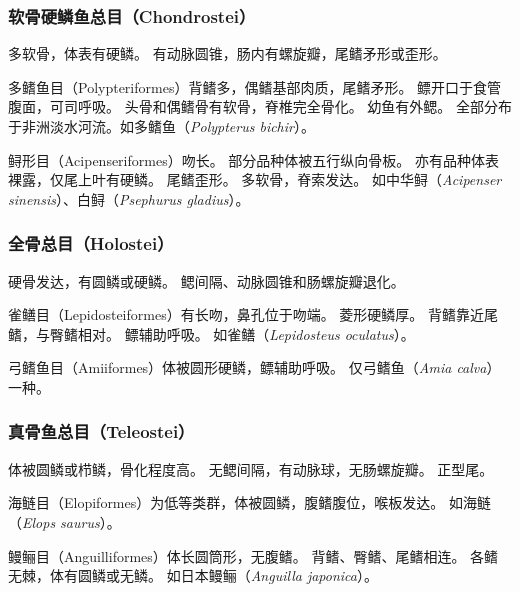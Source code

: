\documentclass[11pt]{article}
\begin{document}
\subsubsection{软骨硬鳞鱼总目（Chondrostei）}
多软骨，体表有硬鳞。
有动脉圆锥，肠内有螺旋瓣，尾鳍矛形或歪形。

\newline

多鳍鱼目（Polypteriformes）背鳍多，偶鳍基部肉质，尾鳍矛形。
鳔开口于食管腹面，可司呼吸。
头骨和偶鳍骨有软骨，脊椎完全骨化。
幼鱼有外鳃。
全部分布于非洲淡水河流。如多鳍鱼（\textit{Polypterus bichir}）。

\newline

鲟形目（Acipenseriformes）吻长。
部分品种体被五行纵向骨板。
亦有品种体表裸露，仅尾上叶有硬鳞。
尾鳍歪形。
多软骨，脊索发达。
如中华鲟（\textit{Acipenser sinensis}）、白鲟（\textit{Psephurus gladius}）。

\subsubsection{全骨总目（Holostei）}
硬骨发达，有圆鳞或硬鳞。
鳃间隔、动脉圆锥和肠螺旋瓣退化。

\newline

雀鳝目（Lepidosteiformes）有长吻，鼻孔位于吻端。
菱形硬鳞厚。
背鳍靠近尾鳍，与臀鳍相对。
鳔辅助呼吸。
如雀鳝（\textit{Lepidosteus oculatus}）。

\newline

弓鳍鱼目（Amiiformes）体被圆形硬鳞，鳔辅助呼吸。
仅弓鳍鱼（\textit{Amia calva}）一种。

\subsubsection{真骨鱼总目（Teleostei）}
体被圆鳞或栉鳞，骨化程度高。
无鳃间隔，有动脉球，无肠螺旋瓣。
正型尾。

\newline

海鲢目（Elopiformes）为低等类群，体被圆鳞，腹鳍腹位，喉板发达。
如海鲢（\textit{Elops saurus}）。

\newline

鳗鲡目（Anguilliformes）体长圆筒形，无腹鳍。
背鳍、臀鳍、尾鳍相连。
各鳍无棘，体有圆鳞或无鳞。
如日本鳗鲡（\textit{Anguilla japonica}）。

\newline
\end{document}
